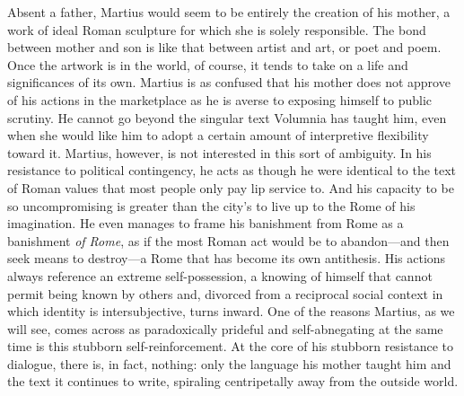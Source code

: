 Absent a father, Martius would seem to be entirely the creation of his mother, a work of ideal Roman sculpture for which she is solely responsible.
The bond between mother and son is like that between artist and art, or poet and poem.
Once the artwork is in the world, of course, it tends to take on a life and significances of its own.
Martius is as confused that his mother does not approve of his actions in the marketplace as he is averse to exposing himself to public scrutiny.
He cannot go beyond the singular text Volumnia has taught him, even when she would like him to adopt a certain amount of interpretive flexibility toward it.
Martius, however, is not interested in this sort of ambiguity.
In his resistance to political contingency, he acts as though he were identical to the text of Roman values that most people only pay lip service to.
And his capacity to be so uncompromising is greater than the city's to live up to the Rome of his imagination.
He even manages to frame his banishment from Rome as a banishment \emph{of Rome}, as if the most Roman act would be to abandon---and then seek means to destroy---a Rome that has become its own antithesis.
His actions always reference an extreme self-possession, a knowing of himself that cannot permit being known by others and, divorced from a reciprocal social context in which identity is intersubjective, turns inward.
One of the reasons Martius, as we will see, comes across as paradoxically prideful and self-abnegating at the same time is this stubborn self-reinforcement.
At the core of his stubborn resistance to dialogue, there is, in fact, nothing: only the language his mother taught him and the text it continues to write, spiraling centripetally away from the outside world.

